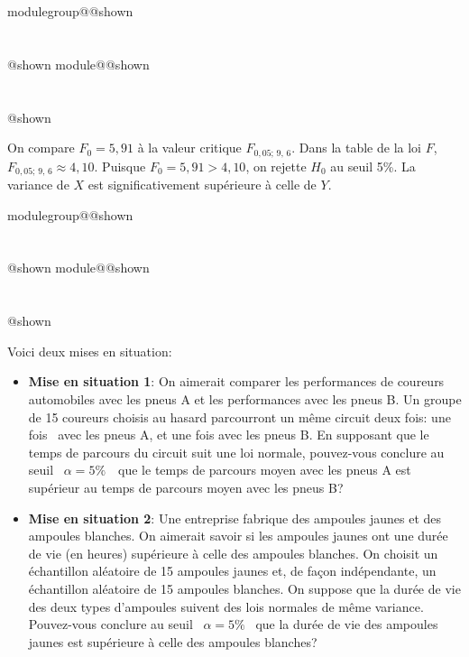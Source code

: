 \documentclass{Evaluation}
\makeatletter
\newcommand{\currentmodulekey}{}
\newcommand{\currentmoduletitle}{}
\newcommand{\currentgroupkey}{}
\newcommand{\currentgrouptitle}{}
\newcommand{\showmoduleifneeded}{%
  \ifx\currentgroupkey\empty\else
    \expandafter\ifx\csname modulegroup@\currentgroupkey @shown\endcsname\relax
      \section*{\currentgrouptitle}%
      \expandafter\gdef\csname modulegroup@\currentgroupkey @shown\endcsname{1}%
    \fi
  \fi
  \expandafter\ifx\csname module@\currentmodulekey @shown\endcsname\relax
    \section*{\currentmoduletitle}%
    \expandafter\gdef\csname module@\currentmodulekey @shown\endcsname{1}%
  \fi
}
\newenvironment{A22}{\showmoduleifneeded}{}
\newenvironment{A25}{\showmoduleifneeded}{}
\makeatother
\begin{document}
\begin{questions}
\begin{A25}
\begin{parts}
\begin{solution}
On compare $F_0 = 5{,}91$ à la valeur critique $F_{0{,}05;\,9,\,6}$. Dans la table de la loi $F$, $F_{0{,}05;\,9,\,6} \approx 4{,}10$. Puisque $F_0 = 5{,}91 > 4{,}10$, on rejette $H_0$ au seuil 5\%. La variance de $X$ est significativement supérieure à celle de $Y$.
\end{solution}




\end{parts}
\end{A25}

\begin{A22}
\question {} %

Voici deux mises en situation:
\begin{itemize}
    \item {\bf Mise en situation 1}: On aimerait comparer les performances de coureurs automobiles avec les pneus A et les performances avec les pneus B. Un groupe de 15 coureurs choisis au hasard parcourront un même circuit deux fois: une fois  avec les pneus A, et une fois avec les pneus B. En supposant que le temps de parcours du circuit suit une loi normale, pouvez-vous conclure au seuil  $\alpha=5\%$  que le temps de parcours moyen avec les pneus A est supérieur au temps de parcours moyen avec les pneus B?
    \item {\bf Mise en situation 2}: Une entreprise fabrique des ampoules jaunes et des ampoules blanches. On aimerait savoir si les ampoules jaunes ont une durée de vie (en heures) supérieure à celle des ampoules blanches. On choisit un échantillon aléatoire de 15 ampoules jaunes et, de façon indépendante, un échantillon aléatoire de 15 ampoules blanches. On suppose que la durée de vie des deux types d'ampoules suivent des lois normales de même variance. Pouvez-vous conclure au seuil  $\alpha=5\%$  que la durée de vie des ampoules jaunes est supérieure à celle des ampoules blanches?
\end{itemize}


\end{A22}
\end{questions}
\end{document}
